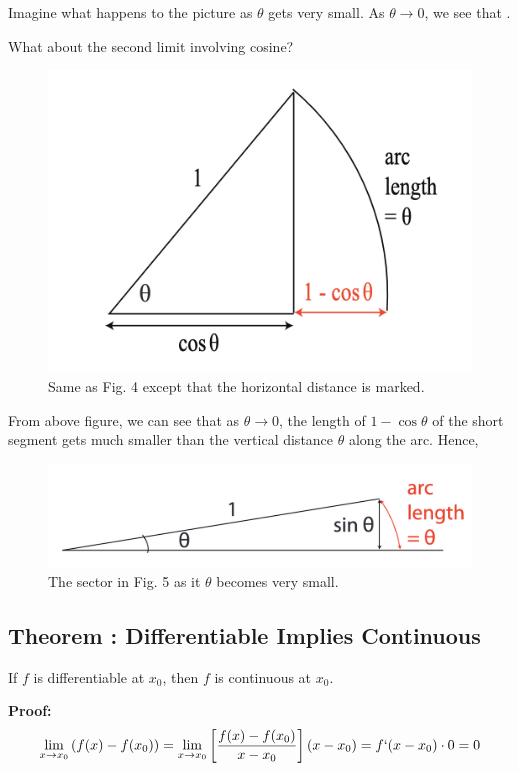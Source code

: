 Imagine what happens to the picture as $\theta$ gets very small.
As $\theta \to 0$, we see that .

\pagebreak

What about the second limit involving cosine?

\begin{figure}[ht!]
	\centering
	\includegraphics[scale=0.5]{./images/lecture_2_figure_3.png}
	\caption{Same as Fig. 4 except that the horizontal distance is marked.}
\end{figure}


From above figure, we can see that as $\theta \to 0$, the length of $1-\cos \theta$ of the short segment gets much smaller than the vertical distance $\theta$ along the arc.
Hence, 


\begin{figure}[ht!]
	\centering
	\includegraphics[scale=0.5]{./images/lecture_2_figure_4.png}
	\caption{The sector in Fig. 5 as it $\theta$ becomes very small.}
\end{figure}

\subsection*{Theorem : Differentiable Implies Continuous}
If $f$ is differentiable at $x_0$, then $f$ is continuous at $x_0$.


{\bf Proof:}
$$
	\lim_{x \to x_0} \left( f(x) - f(x_0) \right)
	= \lim_{x \to x_0} \left[ \frac{f(x) - f(x_0)}{x-x_0} \right] (x - x_0) = f`(x-x_0) \cdot 0 = 0
$$
